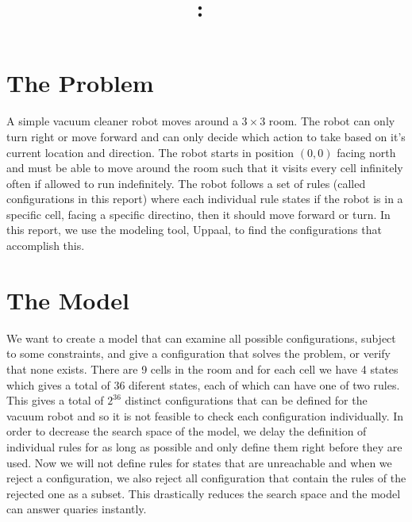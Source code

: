 \documentclass{article}
\title{
\vspace{2in}
\textmd{\textbf{\hmwkClass:\ \hmwkTitle}}\\
\vspace{0.1in}\large{\textit{\hmwkClassInstructor}}
\vspace{3in}
}
\author{\textbf{\hmwkAuthorName}}
\date{} %
\begin{document}
\maketitle



\newpage



\section{The Problem}
    A simple vacuum cleaner robot moves around a $3\times3$ room. The robot can only turn right or move forward and can only decide which action to take based on it's current location and direction. The robot starts in position $(0,0)$ facing north and must be able to move around the room such that it visits every cell infinitely often if allowed to run indefinitely. The robot follows a set of rules (called configurations in this report) where each individual rule states if the robot is in a specific cell, facing a specific directino, then it should move forward or turn. In this report, we use the modeling tool, Uppaal, to find the configurations that accomplish this.

\section{The Model}
    We want to create a model that can examine all possible configurations, subject to some constraints, and give a configuration that solves the problem, or verify that none exists. There are 9 cells in the room and for each cell we have 4 states which gives a total of 36 diferent states, each of which can have one of two rules. This gives a total of $2^{36}$ distinct configurations that can be defined for the vacuum robot and so it is not feasible to check each configuration individually. In order to decrease the search space of the model, we delay the definition of individual rules for as long as possible and only define them right before they are used. Now we will not define rules for states that are unreachable and when we reject a configuration, we also reject all configuration that contain the rules of the rejected one as a subset. This drastically reduces the search space and the model can answer quaries instantly.
\end{document}
